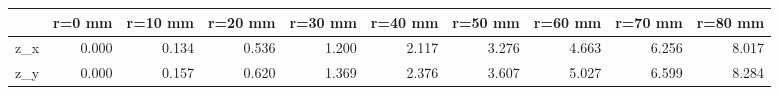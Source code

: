 \documentclass[convert={convertexe={magick.exe}}]{standalone}
\begin{document}
\begin{tabular}{lrrrrrrrrr}
\toprule
{} &  r=0 mm &  r=10 mm &  r=20 mm &  r=30 mm &  r=40 mm &  r=50 mm &  r=60 mm &  r=70 mm &  r=80 mm \\
\midrule
z\_x &   0.000 &    0.134 &    0.536 &    1.200 &    2.117 &    3.276 &    4.663 &    6.256 &    8.017 \\
z\_y &   0.000 &    0.157 &    0.620 &    1.369 &    2.376 &    3.607 &    5.027 &    6.599 &    8.284 \\
\bottomrule
\end{tabular}
\end{document}
